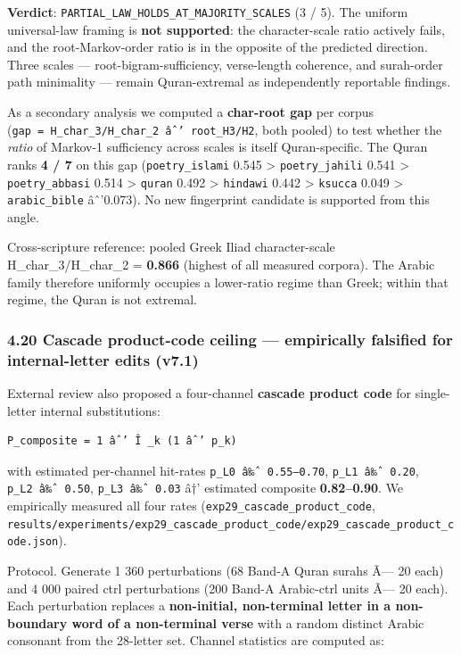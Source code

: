 \documentclass[
]{article}
\begin{document}
\textbf{Verdict}: \texttt{PARTIAL\_LAW\_HOLDS\_AT\_MAJORITY\_SCALES} (3
/ 5). The uniform universal-law framing is \textbf{not supported}: the
character-scale ratio actively fails, and the root-Markov-order ratio is
in the opposite of the predicted direction. Three scales ---
root-bigram-sufficiency, verse-length coherence, and surah-order path
minimality --- remain Quran-extremal as independently reportable
findings.

As a secondary analysis we computed a \textbf{char-root gap} per corpus
(\texttt{gap\ =\ H\_char\_3/H\_char\_2\ âˆ’\ root\_H3/H2}, both pooled)
to test whether the \emph{ratio} of Markov-1 sufficiency across scales
is itself Quran-specific. The Quran ranks \textbf{4 / 7} on this gap
(\texttt{poetry\_islami} 0.545 \textgreater{} \texttt{poetry\_jahili}
0.541 \textgreater{} \texttt{poetry\_abbasi} 0.514 \textgreater{}
\texttt{quran} 0.492 \textgreater{} \texttt{hindawi} 0.442
\textgreater{} \texttt{ksucca} 0.049 \textgreater{}
\texttt{arabic\_bible} âˆ'0.073). No new fingerprint candidate is
supported from this angle.

Cross-scripture reference: pooled Greek Iliad character-scale
H\_char\_3/H\_char\_2 = \textbf{0.866} (highest of all measured
corpora). The Arabic family therefore uniformly occupies a lower-ratio
regime than Greek; within that regime, the Quran is not extremal.

\subsubsection{4.20 Cascade product-code ceiling --- empirically
falsified for internal-letter edits
(v7.1)}\label{cascade-product-code-ceiling-empirically-falsified-for-internal-letter-edits-v7.1}

External review also proposed a four-channel \textbf{cascade product
code} for single-letter internal substitutions:

\begin{verbatim}
P_composite = 1 âˆ’ Î _k (1 âˆ’ p_k)
\end{verbatim}

with estimated per-channel hit-rates \texttt{p\_L0\ â‰ˆ\ 0.55–0.70},
\texttt{p\_L1\ â‰ˆ\ 0.20}, \texttt{p\_L2\ â‰ˆ\ 0.50},
\texttt{p\_L3\ â‰ˆ\ 0.03} â†' estimated composite \textbf{0.82--0.90}.
We empirically measured all four rates
(\texttt{exp29\_cascade\_product\_code},
\texttt{results/experiments/exp29\_cascade\_product\_code/exp29\_cascade\_product\_code.json}).

Protocol. Generate 1 360 perturbations (68 Band-A Quran surahs Ã--- 20
each) and 4 000 paired ctrl perturbations (200 Band-A Arabic-ctrl units
Ã--- 20 each). Each perturbation replaces a \textbf{non-initial,
non-terminal letter in a non-boundary word of a non-terminal verse} with
a random distinct Arabic consonant from the 28-letter set. Channel
statistics are computed as:
\end{document}
